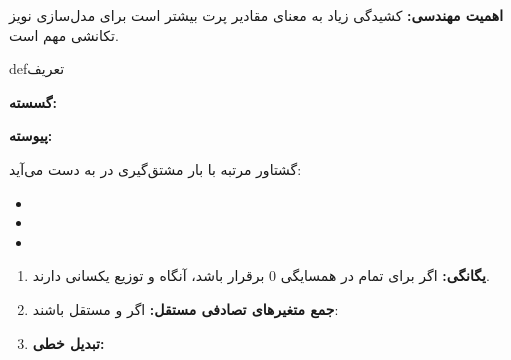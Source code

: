 \textbf{اهمیت مهندسی:} کشیدگی زیاد به معنای مقادیر پرت بیشتر است  برای مدل‌سازی نویز تکانشی مهم است.


\begin{PSbox}[unbreakable]{def}{تعریف}


\textbf{گسسته:} 

\textbf{پیوسته:} 

\end{PSbox}


گشتاور مرتبه  با  بار مشتق‌گیری در  به دست می‌آید:


\begin{itemize}
\tightlist
\item
\item
\item
\end{itemize}


\begin{enumerate}
\def\labelenumi{\arabic{enumi}.}
\item
  \textbf{یگانگی:} اگر  برای تمام  در همسایگی 0 برقرار باشد، آنگاه  و  توزیع یکسانی دارند.
\item
  \textbf{جمع متغیرهای تصادفی مستقل:} اگر  و  مستقل باشند:\PSbr{}
\item
  \textbf{تبدیل خطی:} 
\end{enumerate}


